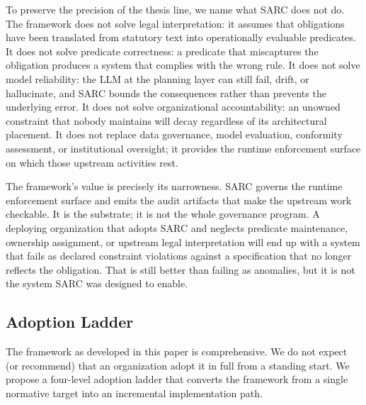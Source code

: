 \documentclass[11pt,a4paper]{article}
\theoremstyle{remark}
\begin{document}
To preserve the precision of the thesis line, we name what SARC does not do. The framework does not solve legal interpretation: it assumes that obligations have been translated from statutory text into operationally evaluable predicates. It does not solve predicate correctness: a predicate that miscaptures the obligation produces a system that complies with the wrong rule. It does not solve model reliability: the LLM at the planning layer can still fail, drift, or hallucinate, and SARC bounds the consequences rather than prevents the underlying error. It does not solve organizational accountability: an unowned constraint that nobody maintains will decay regardless of its architectural placement. It does not replace data governance, model evaluation, conformity assessment, or institutional oversight; it provides the runtime enforcement surface on which those upstream activities rest.

The framework's value is precisely its narrowness. SARC governs the runtime enforcement surface and emits the audit artifacts that make the upstream work checkable. It is the substrate; it is not the whole governance program. A deploying organization that adopts SARC and neglects predicate maintenance, ownership assignment, or upstream legal interpretation will end up with a system that fails as declared constraint violations against a specification that no longer reflects the obligation. That is still better than failing as anomalies, but it is not the system SARC was designed to enable.

\subsection{Adoption Ladder}\label{sec:adoption}

The framework as developed in this paper is comprehensive. We do not expect (or recommend) that an organization adopt it in full from a standing start. We propose a four-level adoption ladder that converts the framework from a single normative target into an incremental implementation path.
\end{document}
